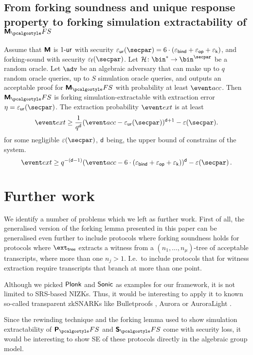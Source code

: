 \documentclass[runningheads,11pt]{llncs}
\begin{document}
\subsection{From forking soundness and unique response property to forking
  simulation extractability of $\marlinprotfs$}
\begin{corollary}
  Assume that $\bm{\mathsf{M}}$ is ${1\text{-}\mathsf{ur}}$ with security
  $\epsur(\secpar) = 6 \cdot (\epsbind + \epsop + \epsk)$, and forking-sound
  with security $\epsfor (\secpar)$. Let $\ro\colon \bin^* \to \bin^\secpar$ be a
  random oracle. Let $\advse$ be an algebraic adversary that can make up to $q$
  random oracle queries, up to $S$ simulation oracle queries, and outputs an
  acceptable proof for $\marlinprotfs$ with probability at least
  $\accProb$. Then $\marlinprotfs$ is forking simulation-extractable with
  extraction error $\eta = \epsur(\secpar)$. The extraction probability
  $\extProb$ is at least
\[
  \extProb \geq \frac{1}{q^{\dconst}} (\accProb - \epsur(\secpar))^{\dconst + 1}
  - \eps(\secpar).
	\]
	for some negligible $\eps(\secpar)$, $\mathsf{d}$ being, the upper bound of
  constrains of the system.
  \[
    \extProb \geq q^{-(\dconst - 1)} (\accProb - 6 \cdot (\epsbind + \epsop +
    \epsk))^{\dconst} -\eps(\secpar)\,.
\]
\end{corollary}

\section{Further work}
We identify a number of problems which we left as further work. First of all,
the generalised version of the forking lemma presented in this paper can be
generalised even further to include protocols where forking soundness holds for
protocols where $\extt$ extracts a witness from a $(n_1, \ldots, n_\mu)$-tree of
acceptable transcripts, where more than one $n_j > 1$. I.e.~to include
protocols that for witness extraction require transcripts that branch at more
than one point.

Although we picked $\textnormal{\textsf{Plonk}}$ and ${\textnormal{\textsf{Sonic}}}$ as examples for our framework, it is
not limited to SRS-based NIZKs. Thus, it would be interesting to apply it to
known so-called transparent zkSNARKs like Bulletproofs \cite{SP:BBBPWM18},
Aurora \cite{EC:BCRSVW19} or AuroraLight \cite{EPRINT:Gabizon19a}.

Since the rewinding technique and the forking lemma used to show simulation
extractability of $\plonkprotfs$ and $\sonicprotfs$ come with security loss,
it would be interesting to show SE of these protocols directly in the
algebraic group model.
\end{document}

